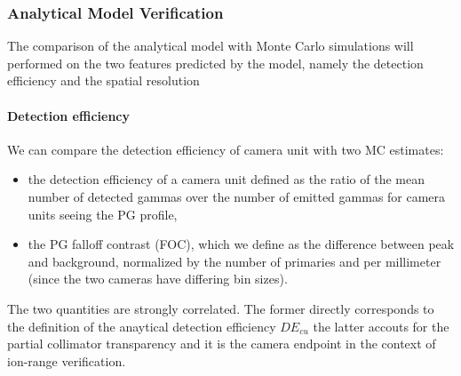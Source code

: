 \documentclass[a4paper,english]{article}
\begin{document}




\subsubsection{Analytical Model Verification}

The comparison of the analytical model with Monte Carlo simulations will performed on the two features predicted by the model, namely the detection efficiency and the spatial resolution

\paragraph{Detection efficiency}

We can compare the detection efficiency of camera unit with two MC estimates:
\begin{itemize}
	\item the detection efficiency of a camera unit defined as the ratio of the mean number of detected gammas over the number of emitted gammas for camera units seeing the PG profile,
	\item the PG falloff contrast (FOC), which we define as the difference between peak and background, normalized by the number of primaries and per millimeter (since the two cameras have differing bin sizes).
\end{itemize}
The two quantities are strongly correlated. The former directly corresponds to the definition of the anaytical detection efficiency $DE_{cu}$ the latter accouts for the partial collimator transparency and it is the camera endpoint in the context of ion-range verification.
\end{document}
